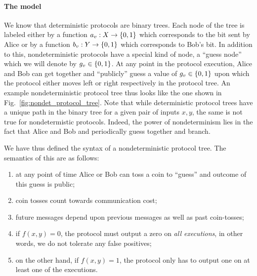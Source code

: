 \documentclass[usletter]{article}
\providecommand\cbrac[1]{\ensuremath \left\{#1\right\}}
\newcommand{\X}{X}
\newcommand{\Y}{Y}
\begin{document}
\paragraph{The model}

We know that deterministic protocols are binary trees. Each node of the tree is labeled either by a function $a_v : \X \to \cbrac{0,1}$ which corresponds to the bit sent by Alice or by a function $b_v : \Y \to \cbrac{0,1}$ which corresponds to Bob's bit. In addition to this, nondeterministic protocols have a special kind of node, a ``guess node'' which we will denote by $g_v \in \cbrac{0,1}$. At any point in the protocol execution, Alice and Bob can get together and ``publicly'' guess a value of $g_v \in \cbrac{0,1}$ upon which the protocol either moves left or right respectively in the protocol tree. An example nondeterministic protocol tree thus looks like the one shown in Fig.~\ref{fig:nondet_protocol_tree}. Note that while deterministic protocol trees have a unique path in the binary tree for a given pair of inputs $x, y$, the same is not true for nondetermistic protocols. Indeed, the power of nondeterminism lies in the fact that Alice and Bob and periodically guess together and branch.

We have thus defined the syntax of a nondeterministic protocol tree. The semantics of this are as follows:
\begin{enumerate}
    \item at any point of time Alice or Bob can toss a coin to ``guess'' and outcome of this guess is public;
    \item coin tosses count towards communication cost;
    \item future messages depend upon previous messages as well as past coin-tosses;
    \item if $f(x, y) = 0$, the protocol must output a zero on \emph{all executions}, in other words, we do not tolerate any false positives;
    \item on the other hand, if $f(x, y) = 1$, the protocol only has to output one on at least one of the executions.
\end{enumerate}
\end{document}
